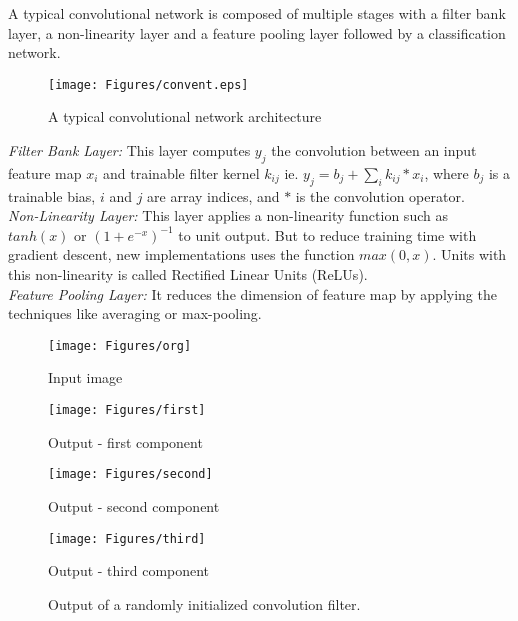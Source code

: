 \documentclass{llncs}
\begin{document}
\par
A typical convolutional  network is composed of multiple stages with a filter bank layer, a non-linearity layer and a feature pooling layer \cite{lecun2010convolutional} followed by a classification network.\\
\vspace*{-6mm}
\begin{figure}[ht]
 \texttt{[image: Figures/convent.eps]}
\caption{A typical convolutional network architecture }
\label{net}
\end{figure}
\vspace*{-6mm}
\emph{Filter Bank Layer:} This layer computes $y_{j}$ the convolution between an input feature map   $x_i$ and trainable filter kernel $k_{ij}$ 
 ie. $y_j=b_j+\sum_i {k_{ij}*x_i}$, where $b_j$ is a trainable bias, $i$ and $j$ are  array indices, and $*$ is the convolution operator.\\
\emph{Non-Linearity Layer:} This layer applies a non-linearity function such as $tanh(x)$ or $(1+e^{-x})^{-1}$ to unit output. But to reduce training time with gradient descent, new implementations uses the function $max(0,x)$. Units with this non-linearity is called Rectified Linear Units (ReLUs).\\
\emph{Feature Pooling Layer:} It  reduces the dimension of  feature map by applying the techniques like averaging or max-pooling.
\begin{figure}[t]

\begin{minipage}[b]{.48\linewidth}
  \centering
  \centerline{\texttt{[image: Figures/org]}}
  \centerline{Input image}\medskip
\end{minipage}
%
\begin{minipage}[b]{.48\linewidth}
  \centering
  \centerline{\texttt{[image: Figures/first]}}
  \centerline{Output - first component }\medskip
\end{minipage}

\begin{minipage}[b]{0.48\linewidth}
  \centering
  \centerline{\texttt{[image: Figures/second]}}
  \centerline{Output - second component}\medskip
\end{minipage}
%
\begin{minipage}[b]{0.48\linewidth}
  \centering
  \centerline{\texttt{[image: Figures/third]}}
  \centerline{Output - third component}\medskip
\end{minipage}
%
\caption{Output of a randomly initialized convolution filter.
}
\label{fig:res}
%
\end{figure}
\end{document}

